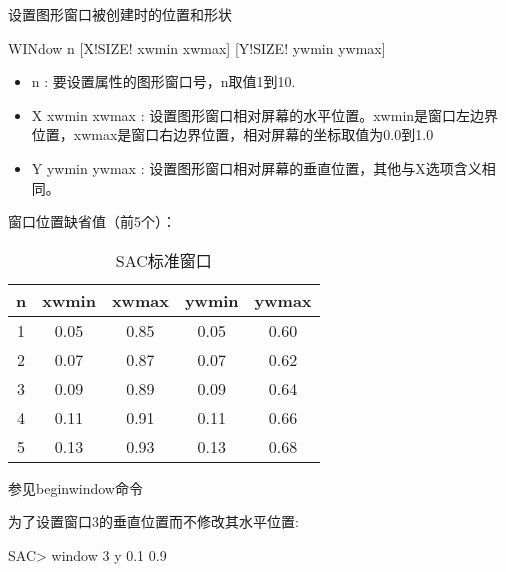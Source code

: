 \label{cmd:window}

设置图形窗口被创建时的位置和形状

\begin{SACSTX}
WINdow n [X!SIZE! xwmin xwmax]  [Y!SIZE! ywmin ywmax]
\end{SACSTX}

\begin{itemize}
\item n : 要设置属性的图形窗口号，n取值1到10. 
\item X xwmin xwmax : 设置图形窗口相对屏幕的水平位置。xwmin是窗口左边界位置，xwmax是窗口右边界位置，相对屏幕的坐标取值为0.0到1.0  
\item Y ywmin ywmax : 设置图形窗口相对屏幕的垂直位置，其他与X选项含义相同。
\end{itemize}

窗口位置缺省值（前5个）： 
\begin{table}[!ht]
\centering
\caption{SAC标准窗口}
\begin{tabular}{ccccc}
\toprule
 n & xwmin & xwmax & ywmin & ywmax  \\
\midrule
 1 & 0.05  & 0.85  & 0.05  & 0.60 \\
 2 & 0.07  & 0.87  & 0.07  & 0.62 \\
 3 & 0.09  & 0.89  & 0.09  & 0.64 \\
 4 & 0.11  & 0.91  & 0.11  & 0.66 \\
 5 & 0.13  & 0.93  & 0.13  & 0.68 \\
\bottomrule
\end{tabular}
\end{table}

参见beginwindow命令

为了设置窗口3的垂直位置而不修改其水平位置:
\begin{SACCode}
SAC> window 3 y 0.1 0.9
\end{SACCode}
